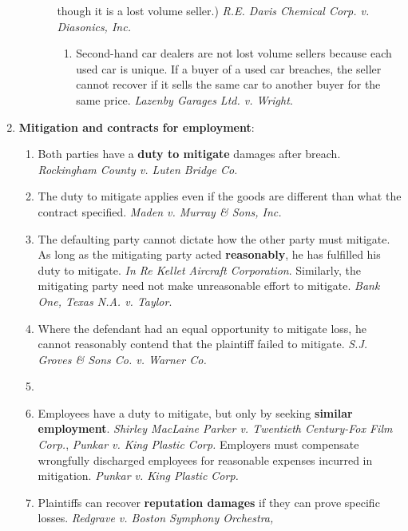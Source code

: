 \begin{enumerate}
\begin{enumerate}
\begin{enumerate}
            though it is a lost volume seller.) \emph{R.E. Davis Chemical Corp. 
            v. Diasonics, Inc.}
            \begin{enumerate}
                \item Second-hand car dealers are not lost volume sellers 
                because each used car is unique. If a buyer of a used car 
                breaches, the seller cannot recover if it sells the same car 
                to another buyer for the same price. \emph{Lazenby Garages 
                Ltd. v. Wright}.
            \end{enumerate}
        \end{enumerate}
    \end{enumerate}
    \item \textbf{Mitigation and contracts for employment}:
    \begin{enumerate}
        \item Both parties have a \textbf{duty to mitigate} damages after 
        breach. \emph{Rockingham County v. Luten Bridge Co.}
        \item The duty to mitigate applies even if the goods are different 
        than what the contract specified. \emph{Maden v. Murray \& Sons, Inc.}
        \item The defaulting party cannot dictate how the other party must 
        mitigate. As long as the mitigating party acted \textbf{reasonably}, 
        he has fulfilled his duty to mitigate. \emph{In Re Kellet Aircraft 
        Corporation}. Similarly, the mitigating party need not make 
        unreasonable effort to mitigate. \emph{Bank One, Texas N.A. v.  Taylor}.
        \item Where the defendant had an equal opportunity to mitigate loss, 
        he cannot reasonably contend that the plaintiff failed to mitigate. 
        \emph{S.J. Groves \& Sons Co. v. Warner Co.}
        \item %
        \item Employees have a duty to mitigate, but only by seeking 
        \textbf{similar employment}. \emph{Shirley MacLaine Parker v.  
        Twentieth Century-Fox Film Corp.}, \emph{Punkar v. King Plastic 
        Corp.} Employers must compensate wrongfully discharged employees for 
        reasonable expenses incurred in mitigation. \emph{Punkar v. King 
        Plastic Corp.}
        \item Plaintiffs can recover \textbf{reputation damages} if they can 
        prove specific losses. \emph{Redgrave v. Boston Symphony Orchestra, 
}
\end{enumerate}
\end{enumerate}
